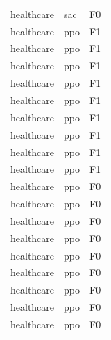 \begin{tabular}{lll}
healthcare &       sac &  F0 \\
healthcare &       ppo &  F1 \\
healthcare &       ppo &  F1 \\
healthcare &       ppo &  F1 \\
healthcare &       ppo &  F1 \\
healthcare &       ppo &  F1 \\
healthcare &       ppo &  F1 \\
healthcare &       ppo &  F1 \\
healthcare &       ppo &  F1 \\
healthcare &       ppo &  F1 \\
healthcare &       ppo &  F0 \\
healthcare &       ppo &  F0 \\
healthcare &       ppo &  F0 \\
healthcare &       ppo &  F0 \\
healthcare &       ppo &  F0 \\
healthcare &       ppo &  F0 \\
healthcare &       ppo &  F0 \\
healthcare &       ppo &  F0 \\
healthcare &       ppo &  F0 \\
\bottomrule
\end{tabular}
